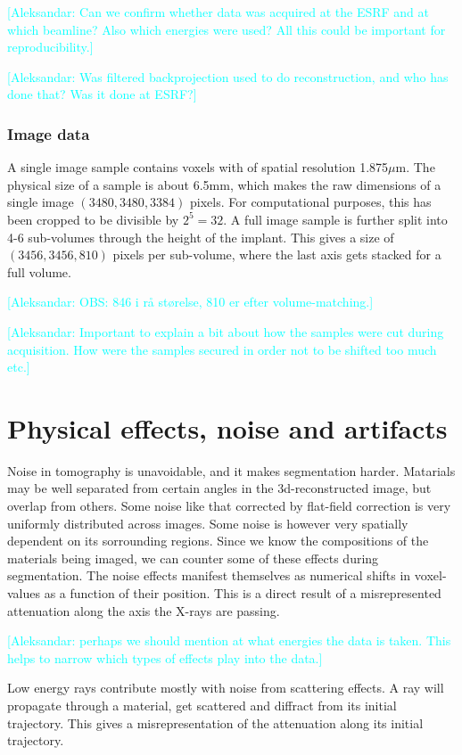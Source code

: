 \documentclass[times,twocolumn,final]{elsarticle}
\newcommand{\aleksandar}[1]{\textcolor{cyan}{[Aleksandar: #1]}}
\begin{document}
\aleksandar{Can we confirm whether data was acquired at the ESRF and at which beamline? Also which energies were used? All this could be important for reproducibility.}

\aleksandar{Was filtered backprojection used to do reconstruction, and who has done that? Was it done at ESRF?}

\subsubsection*{Image data}

A single image sample contains voxels with of spatial resolution 1.875$\mu$m. The physical size of
a sample is about 6.5mm, which makes the raw dimensions of a single image $(3480,3480,3384)$ pixels.
For computational purposes, this has been cropped to be divisible by $2^5=32$. A full image sample
is further split into 4-6 sub-volumes through the height of the implant. This gives a size of $(3456,3456,810)$ pixels per sub-volume, where the last axis gets stacked for a full volume.

\aleksandar{OBS: 846 i rå størelse, 810 er efter volume-matching.}

\aleksandar{Important to explain a bit about how the samples were cut during acquisition. How were the samples secured in order not to be shifted too much etc.}

\section*{Physical effects, noise and artifacts}

Noise in tomography is unavoidable, and it makes segmentation harder. Matarials may be well separated from certain angles in the 3d-reconstructed image, but overlap from others. Some noise like that corrected by flat-field correction is very uniformly distributed across images. Some noise is however very spatially dependent on its sorrounding regions. Since we know the compositions of the materials being imaged, we can counter some of these effects during segmentation. The noise effects manifest themselves as numerical shifts in voxel-values as a function of their position. This is a direct result of a misrepresented attenuation along the axis the X-rays are passing. 

\aleksandar{perhaps we should mention at what energies the data is taken. This helps to narrow which types of effects play into the data.}

Low energy rays contribute mostly with noise from scattering effects. A ray will propagate through a material, get scattered and diffract from its initial trajectory. This gives a misrepresentation of the attenuation along its initial trajectory.
\end{document}

